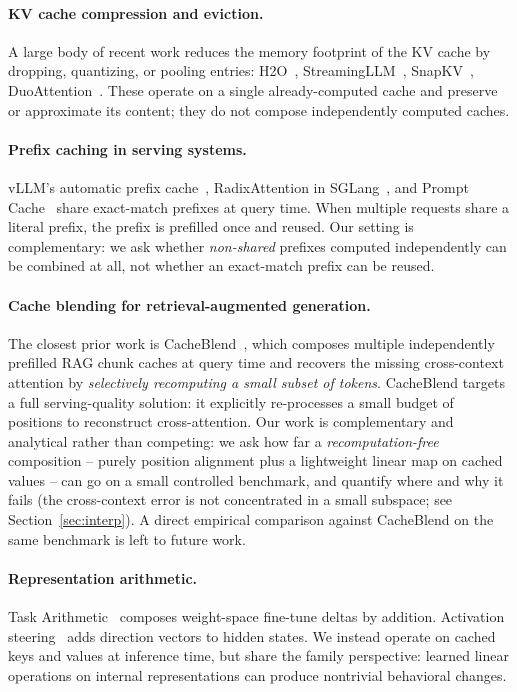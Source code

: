 \paragraph{KV cache compression and eviction.} A large body of recent work reduces the memory footprint of the KV cache by dropping, quantizing, or pooling entries: H2O~\citep{zhang2023h2o}, StreamingLLM~\citep{xiao2023streamingllm}, SnapKV~\citep{li2024snapkv}, DuoAttention~\citep{xiao2024duoattention}. These operate on a single already-computed cache and preserve or approximate its content; they do not compose independently computed caches.

\paragraph{Prefix caching in serving systems.} vLLM's automatic prefix cache~\citep{kwon2023vllm}, RadixAttention in SGLang~\citep{zheng2024sglang}, and Prompt Cache~\citep{gim2023prompt} share exact-match prefixes at query time. When multiple requests share a literal prefix, the prefix is prefilled once and reused. Our setting is complementary: we ask whether \emph{non-shared} prefixes computed independently can be combined at all, not whether an exact-match prefix can be reused.

\paragraph{Cache blending for retrieval-augmented generation.} The closest prior work is CacheBlend~\citep{yao2024cacheblend}, which composes multiple independently prefilled RAG chunk caches at query time and recovers the missing cross-context attention by \emph{selectively recomputing a small subset of tokens}. CacheBlend targets a full serving-quality solution: it explicitly re-processes a small budget of positions to reconstruct cross-attention. Our work is complementary and analytical rather than competing: we ask how far a \emph{recomputation-free} composition -- purely position alignment plus a lightweight linear map on cached values -- can go on a small controlled benchmark, and quantify where and why it fails (the cross-context error is not concentrated in a small subspace; see Section~\ref{sec:interp}). A direct empirical comparison against CacheBlend on the same benchmark is left to future work.

\paragraph{Representation arithmetic.} Task Arithmetic~\citep{ilharco2022editing} composes weight-space fine-tune deltas by addition. Activation steering~\citep{turner2023activation} adds direction vectors to hidden states. We instead operate on cached keys and values at inference time, but share the family perspective: learned linear operations on internal representations can produce nontrivial behavioral changes.

